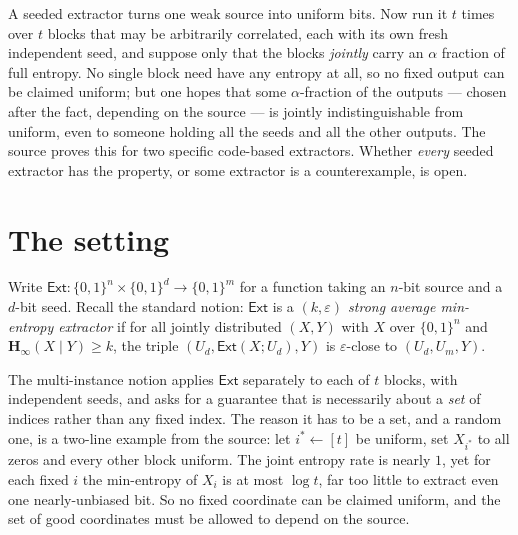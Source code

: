 \documentclass{aicr-conjecture}
\newcommand{\bits}{\{0,1\}}
\newcommand{\Ext}{\mathsf{Ext}}
\newcommand{\Hmin}{\mathbf{H}_{\infty}}
\newcommand{\eps}{\varepsilon}
\begin{document}

\vspace{0.4em}

\begin{informalconjecture}
A seeded extractor turns one weak source into uniform bits. Now run it
$t$ times over $t$ blocks that may be arbitrarily correlated, each with
its own fresh independent seed, and suppose only that the blocks
\emph{jointly} carry an $\alpha$ fraction of full entropy. No single
block need have any entropy at all, so no fixed output can be claimed
uniform; but one hopes that some $\alpha$-fraction of the outputs ---
chosen after the fact, depending on the source --- is jointly
indistinguishable from uniform, even to someone holding all the seeds and
all the other outputs. The source proves this for two specific
code-based extractors. Whether \emph{every} seeded extractor has the
property, or some extractor is a counterexample, is open.
\end{informalconjecture}

\section{The setting}\label{sec:setting}

Write $\Ext : \bits^{n} \times \bits^{d} \to \bits^{m}$ for a function
taking an $n$-bit source and a $d$-bit seed. Recall the standard notion:
$\Ext$ is a \emph{$(k,\eps)$ strong average min-entropy extractor} if for
all jointly distributed $(X, Y)$ with $X$ over $\bits^{n}$ and
$\Hmin(X \mid Y) \ge k$, the triple $(U_d, \Ext(X; U_d), Y)$ is
$\eps$-close to $(U_d, U_m, Y)$.

The multi-instance notion applies $\Ext$ separately to each of $t$
blocks, with independent seeds, and asks for a guarantee that is
necessarily about a \emph{set} of indices rather than any fixed index.
The reason it has to be a set, and a random one, is a two-line example
from the source: let $i^{*} \leftarrow [t]$ be uniform, set
$X_{i^{*}}$ to all zeros and every other block uniform. The joint entropy
rate is nearly $1$, yet for each fixed $i$ the min-entropy of $X_i$ is at
most $\log t$, far too little to extract even one nearly-unbiased bit. So
no fixed coordinate can be claimed uniform, and the set of good
coordinates must be allowed to depend on the source.
\end{document}
